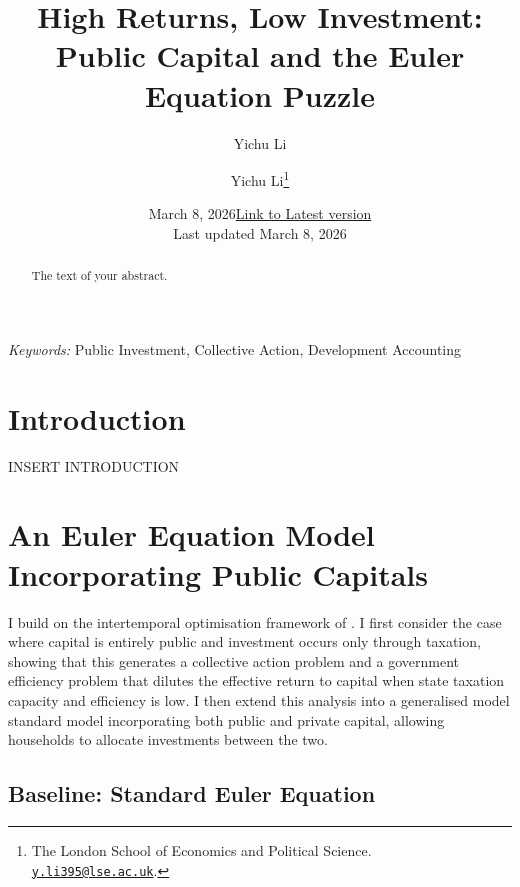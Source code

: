 \documentclass[
  11pt]{article}
\title{\mytitle}
\author{\LARGE Yichu Li}
\date{March 8, 2026}
\newcommand{\mytitle}{High Returns, Low Investment: \\ Public Capital and the Euler Equation Puzzle}
\begin{document}
\def\spacingset#1{\renewcommand{\baselinestretch}%
{#1}\small\normalsize} \spacingset{1}



\date{\href{https://tsssssssshark.github.io/euler-collective-action/output/main.pdf}{Link to Latest version}\\ \vspace{1em}  Last updated March
8, 2026}
\title{\mytitle}
\author{
\LARGE Yichu Li\thanks{The London School of Economics and Political
Science.
\href{mailto:y.li395@lse.ac.uk}{\nolinkurl{y.li395@lse.ac.uk}}.}\\
}
\maketitle

\bigskip
\bigskip
\begin{abstract}
The text of your abstract.
\end{abstract}

\bigskip
\noindent%
{\it Keywords:} Public Investment, Collective Action, Development
Accounting
\vfill

\newpage
\spacingset{1.2} %

\section{Introduction}\label{sec-intro}

INSERT INTRODUCTION

\section{An Euler Equation Model Incorporating Public
Capitals}\label{sec-model}

I build on the intertemporal optimisation framework of
\citet{kremer2019}. I first consider the case where capital is entirely
public and investment occurs only through taxation, showing that this
generates a collective action problem and a government efficiency
problem that dilutes the effective return to capital when state taxation
capacity and efficiency is low. I then extend this analysis into a
generalised model standard model incorporating both public and private
capital, allowing households to allocate investments between the two.

\subsection{Baseline: Standard Euler Equation}\label{sec-baseline}
\end{document}
